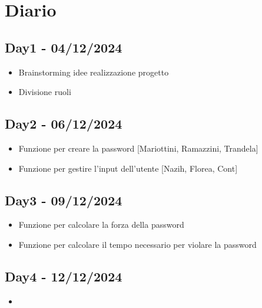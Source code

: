 \documentclass{scrartcl}
\begin{document}
    \section{Diario}

        \subsection{Day1 - 04/12/2024}
            \begin{itemize}
                \item Brainstorming idee realizzazione progetto
                \item Divisione ruoli
            \end{itemize}
        
        \subsection{Day2 - 06/12/2024}
            \begin{itemize}
                \item Funzione per creare la password [Mariottini, Ramazzini, Trandela]
                \item Funzione per gestire l'input dell'utente [Nazih, Florea, Cont]
            \end{itemize}
            
        \subsection{Day3 - 09/12/2024}
            \begin{itemize}
                \item Funzione per calcolare la forza della password
                \item Funzione per calcolare il tempo necessario per violare la password
            \end{itemize}

        \subsection{Day4 - 12/12/2024}
        \begin{itemize}
            \item 
        \end{itemize}
\end{document}
